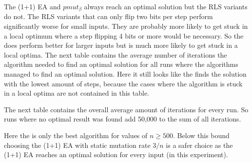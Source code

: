 

The (1+1) EA and $pmut_\beta$ always reach an optimal solution but the RLS variants do not.
The RLS variants that can only flip two bits per step perform significantly worse for small inputs.
They are probably more likely to get stuck in a local optimum where a step flipping 4 bits or more would be necessary.
So the \RLSN[2] does perform better for larger inputs but is much more likely to get stuck in a local optima.
The next table contains the average number of iterations the algorithm needed to find an optimal solution for all runs where the algorithms managed to find an optimal solution.
Here it still looks like the \RLSN[2] finds the solution with the lowest amount of steps, because the cases where the algorithm is stuck in a local optima are not contained in this table.



The next table contains the overall average amount of iterations for every run.
So runs where no optimal result was found add 50,000 to the sum of all iterations.



Here the \RLSN[2] is only the best algorithm for values of $n \ge 500$.
Below this bound choosing the (1+1) EA with static mutation rate $3/n$ is a safer choice as the (1+1) EA reaches an optimal solution for every input (in this experiment).
